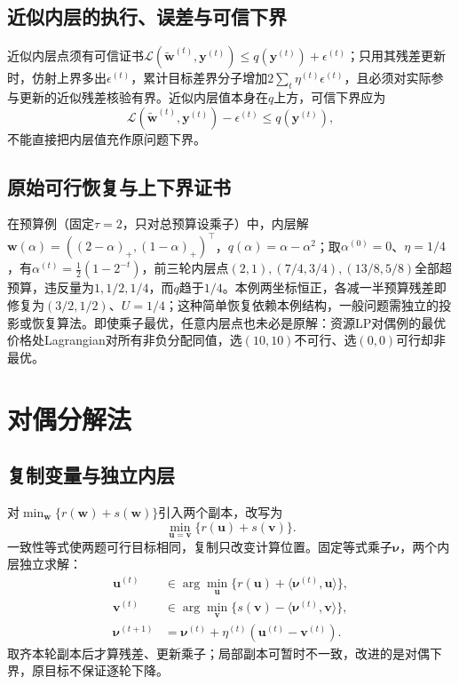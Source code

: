 \subsection{近似内层的执行、误差与可信下界}

近似内层点须有可信证书$\mathcal L(\widetilde{\bm w}^{(t)},\bm y^{(t)})\leq q(\bm y^{(t)})+\epsilon^{(t)}$；只用其残差更新时，仿射上界多出$\epsilon^{(t)}$，累计目标差界分子增加$2\sum_t\eta^{(t)}\epsilon^{(t)}$，且必须对实际参与更新的近似残差核验有界。近似内层值本身在$q$上方，可信下界应为
\[
 \mathcal L(\widetilde{\bm w}^{(t)},\bm y^{(t)})-\epsilon^{(t)}\leq q(\bm y^{(t)}),
\]
不能直接把内层值充作原问题下界。

\subsection{原始可行恢复与上下界证书}

在预算例（固定$\tau=2$，只对总预算设乘子）中，内层解$\bm w(\alpha)=((2-\alpha)_+,(1-\alpha)_+)^\top$，$q(\alpha)=\alpha-\alpha^2$；取$\alpha^{(0)}=0$、$\eta=1/4$，有$\alpha^{(t)}=\frac12(1-2^{-t})$，前三轮内层点$(2,1),(7/4,3/4),(13/8,5/8)$全部超预算，违反量为$1,1/2,1/4$，而$q$趋于$1/4$。本例两坐标恒正，各减一半预算残差即修复为$(3/2,1/2)$、$U=1/4$；这种简单恢复依赖本例结构，一般问题需独立的投影或恢复算法。即使乘子最优，任意内层点也未必是原解：资源LP对偶例的最优价格处Lagrangian对所有非负分配同值，选$(10,10)$不可行、选$(0,0)$可行却非最优。

\section{对偶分解法}

\subsection{复制变量与独立内层}

对$\min_{\bm w}\{r(\bm w)+s(\bm w)\}$引入两个副本，改写为
\[
 \min_{\bm u=\bm v}\{r(\bm u)+s(\bm v)\}.
\]
一致性等式使两题可行目标相同，复制只改变计算位置。固定等式乘子$\bm\nu$，两个内层独立求解：
\begin{equation}
 \begin{aligned}
 \bm u^{(t)}&\in\arg\min_{\bm u}\{r(\bm u)+\langle\bm\nu^{(t)},\bm u\rangle\},\\
 \bm v^{(t)}&\in\arg\min_{\bm v}\{s(\bm v)-\langle\bm\nu^{(t)},\bm v\rangle\},\\
 \bm\nu^{(t+1)}&=\bm\nu^{(t)}+\eta^{(t)}(\bm u^{(t)}-\bm v^{(t)}).
 \end{aligned}
 \label{eq:opt-consensus-dual-decomposition}
\end{equation}
取齐本轮副本后才算残差、更新乘子；局部副本可暂时不一致，改进的是对偶下界，原目标不保证逐轮下降。


